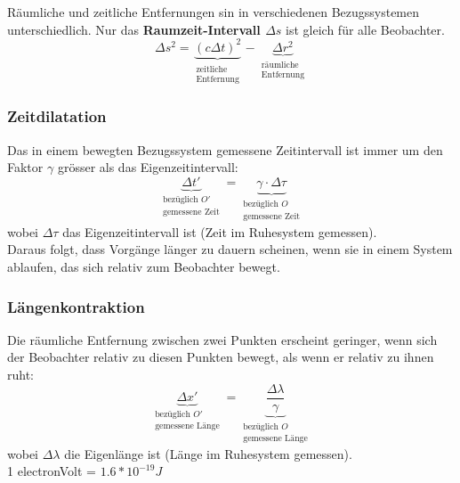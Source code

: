 \documentclass[7pt]{article}
\begin{document}
\begin{multicols*}{3}
R{\"a}umliche und zeitliche Entfernungen sin in verschiedenen Bezugssystemen unterschiedlich. Nur das \textbf{Raumzeit-Intervall $\Delta s$} ist gleich f{\"u}r alle Beobachter.
\begin{equation*}
	\Delta s^2 = \underbrace{(c\Delta t)^2}_{\substack{\text{zeitliche}\\ \text{Entfernung}}} - \underbrace{\Delta r^2}_{\substack{\text{r{\"a}umliche}\\ \text{Entfernung}}}
\end{equation*}

\subsubsection{Zeitdilatation}

Das in einem bewegten Bezugssystem gemessene Zeitintervall ist immer um den Faktor $\gamma$ gr{\"o}sser als das Eigenzeitintervall:
\begin{equation*}
	\underbrace{\Delta t'}_{\substack{\text{bez{\"u}glich $O'$}\\ \text{gemessene Zeit}}}  =  \underbrace{\gamma \cdot \Delta\tau}_{\substack{\text{bez{\"u}glich $O$}\\ \text{gemessene Zeit}}}
\end{equation*}
wobei $\Delta\tau$ das Eigenzeitintervall ist (Zeit im Ruhesystem gemessen). \\

Daraus folgt, dass Vorg{\"a}nge l{\"a}nger zu dauern scheinen, wenn sie in einem System ablaufen, das sich relativ zum Beobachter bewegt.

\subsubsection{L{\"a}ngenkontraktion}

Die r{\"a}umliche Entfernung zwischen zwei Punkten erscheint geringer, wenn sich der Beobachter relativ zu diesen Punkten bewegt, als wenn er relativ zu ihnen ruht:
\begin{equation*}
	\underbrace{\Delta x'}_{\substack{\text{bez{\"u}glich $O'$}\\ \text{gemessene L{\"a}nge}}}  =  \underbrace{\frac{\Delta\lambda}{\gamma}}_{\substack{\text{bez{\"u}glich $O$}\\ \text{gemessene L{\"a}nge}}}
\end{equation*}
wobei $\Delta\lambda$ die Eigenl{\"a}nge ist (L{\"a}nge im Ruhesystem gemessen).\\
1 electronVolt = $1.6*10^{-19}J$

\end{multicols*}
\end{document}
